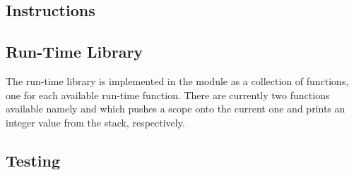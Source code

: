 \subsection{Instructions}
\label{sec:implementation:instr}


\subsection{Run-Time Library}

The run-time library is implemented in the  module as a
collection of functions, one for each available run-time function. There are
currently two functions available namely  and 
which pushes a scope onto the current one and prints an integer value from the
stack, respectively.

\subsection{Testing}








